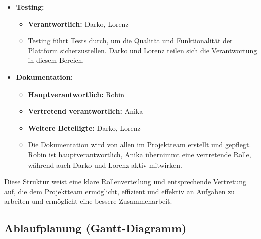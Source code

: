 \begin{itemize}[itemsep=1em, leftmargin=*]
    \item \textbf{Testing:}
    \begin{itemize}
        \item \textbf{Verantwortlich:} Darko, Lorenz
        \item Testing führt Tests durch, um die Qualität und Funktionalität der Plattform sicherzustellen.
        Darko und Lorenz teilen sich die Verantwortung in diesem Bereich.
    \end{itemize}

    \item \textbf{Dokumentation:}
    \begin{itemize}
        \item \textbf{Hauptverantwortlich:} Robin
        \item \textbf{Vertretend verantwortlich:} Anika
        \item \textbf{Weitere Beteiligte:} Darko, Lorenz
        \item Die Dokumentation wird von allen im Projektteam erstellt und gepflegt.
        Robin ist hauptverantwortlich, Anika übernimmt eine vertretende Rolle, während auch Darko und Lorenz aktiv mitwirken.
    \end{itemize}
\end{itemize}


Diese Struktur weist eine klare Rollenverteilung und entsprechende Vertretung auf, die dem Projektteam ermöglicht, effizient und effektiv an Aufgaben zu arbeiten und ermöglicht eine bessere Zusammenarbeit.



\subsection{Ablaufplanung (Gantt-Diagramm)}\label{subsec:ablaufplan}

